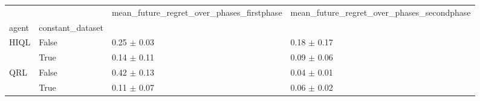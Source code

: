 \begin{tabular}{llll}
\toprule
 &  & mean_future_regret_over_phases_firstphase & mean_future_regret_over_phases_secondphase \\
agent & constant_dataset &  &  \\
\midrule
\multirow[t]{2}{*}{HIQL} & False & 0.25 $\pm$ 0.03 & 0.18 $\pm$ 0.17 \\
 & True & 0.14 $\pm$ 0.11 & 0.09 $\pm$ 0.06 \\
\cline{1-4}
\multirow[t]{2}{*}{QRL} & False & 0.42 $\pm$ 0.13 & 0.04 $\pm$ 0.01 \\
 & True & 0.11 $\pm$ 0.07 & 0.06 $\pm$ 0.02 \\
\cline{1-4}
\bottomrule
\end{tabular}

